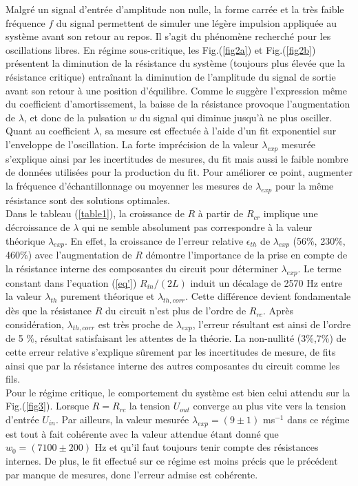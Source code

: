 \documentclass[a4paper, 12pt,oneside]{article}
\begin{document}
Malgré un signal d'entrée d'amplitude non nulle, la forme carrée et la très faible fréquence $f$ du signal permettent de simuler une légère impulsion appliquée au système avant son retour au repos. Il s'agit du phénomène recherché pour les oscillations libres. En régime sous-critique, les Fig.(\ref{fig2a}) et Fig.(\ref{fig2b}) présentent la diminution de la résistance du système (toujours plus élevée que la résistance critique) entraînant la diminution de l'amplitude du signal de sortie avant son retour à une position d'équilibre. Comme le suggère l'expression même du coefficient d'amortissement, la baisse de la résistance provoque l'augmentation de $\lambda$, et donc de la pulsation $w$ du signal qui diminue jusqu'à ne plus osciller.\\
Quant au coefficient $\lambda$, sa mesure est effectuée à l'aide d'un fit exponentiel sur l'enveloppe de l'oscillation. La forte imprécision de la valeur $\lambda_{exp}$ mesurée s'explique ainsi par les incertitudes de mesures, du fit mais aussi le faible nombre de données utilisées pour la production du fit. Pour améliorer ce point, augmenter la fréquence d'échantillonnage ou moyenner les mesures de $\lambda_{exp}$ pour la même résistance sont des solutions optimales.\\
Dans le tableau (\ref{table1}), la croissance de $R$ à partir de $R_{cr}$ implique une décroissance de $\lambda$ qui ne semble absolument pas correspondre à la valeur théorique $\lambda_{exp}$. En effet, la croissance de l'erreur relative $\epsilon_{th}$ de $\lambda_{exp}$ (56\%, 230\%, 460\%) avec l'augmentation de $R$ démontre l'importance de la prise en compte de la résistance interne des composantes du circuit pour déterminer $\lambda_{exp}$. Le terme constant dans l'equation (\ref{eq'}) $R_{in}/(2L)$ induit un décalage de 2570 Hz entre la valeur $\lambda_{th}$ purement théorique et $\lambda_{th,corr}$. Cette différence devient fondamentale dès que la résistance $R$ du circuit n'est plus de l'ordre de $R_{rc}$. Après considération, $\lambda_{th,corr}$ est très proche de $\lambda_{exp}$, l'erreur résultant est ainsi de l'ordre de 5 \%, résultat satisfaisant les attentes de la théorie. La non-nullité (3\%,7\%) de cette erreur relative s'explique sûrement par les incertitudes de mesure, de fits ainsi que par la résistance interne des autres composantes du circuit comme les fils.\\
Pour le régime critique, le comportement du système est bien celui attendu sur la Fig.(\ref{fig3}). Lorsque $R = R_{rc}$ la tension $U_{out}$ converge au plus vite vers la tension d'entrée $U_{in}$. Par ailleurs, la valeur mesurée $\lambda_{exp} = (9 \pm 1)$ ms$^{-1}$ dans ce régime est tout à fait cohérente avec la valeur attendue étant donné que $w_0 = (7100 \pm 200)$ Hz et qu'il faut toujours tenir compte des résistances internes. De plus, le fit effectué sur ce régime est moins précis que le précédent par manque de mesures, donc l'erreur admise est cohérente.\\
\end{document}
